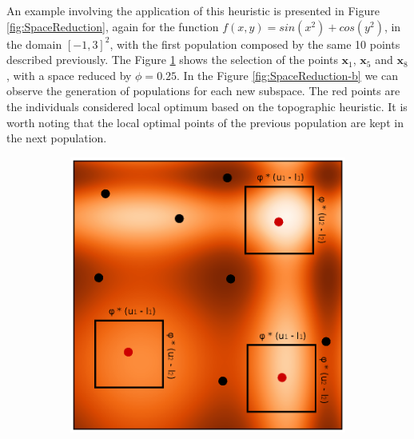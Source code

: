 An example involving the application of this heuristic is presented in Figure \ref{fig:SpaceReduction}, again for the function $f(x, y) = sin(x^2) + cos(y^2)$, in the domain $[-1, 3]^2$, with the first population composed by the same 10 points described previously. The Figure \ref{fig:SpaceReduction-a} shows the selection of the points $\bm{x}_1$, $\bm{x}_5$ and $\bm{x}_8$, with a space reduced by $\phi = 0.25$. In the Figure \ref{fig:SpaceReduction-b} we can observe the generation of populations for each new subspace. The red points are the individuals considered local optimum based on the topographic heuristic. It is worth noting that the local optimal points of the previous population are kept in the next population.


\begin{figure}[tp]
\centering
\begin{subfigure}{.5\textwidth}
  \centering
  \includegraphics[width=1.1\linewidth]{fig_2.eps}
  \caption{}
  \label{fig:SpaceReduction-a}
\end{subfigure}%
\begin{subfigure}{.5\textwidth}
  \centering

\end{subfigure}
\end{figure}
